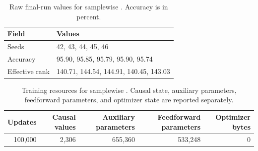 \begin{table}[H]
\centering
\small
\caption{Raw final-run values for samplewise \TeReL{}. Accuracy is in percent.}
\label{tab:residual-state-raw}
\begin{tabular}{ll}
\toprule
Field & Values \\
\midrule
Seeds & 42, 43, 44, 45, 46 \\
Accuracy & 95.90, 95.85, 95.79, 95.90, 95.74 \\
Effective rank & 140.71, 144.54, 144.91, 140.45, 143.03 \\
\bottomrule
\end{tabular}
\end{table}

\begin{table}[H]
\centering
\small
\caption{Training resources for samplewise \TeReL{}. Causal state, auxiliary parameters, feedforward parameters, and optimizer state are reported separately.}
\label{tab:residual-state-resources}
\begin{tabular}{rrrrr}
\toprule
Updates & Causal values & Auxiliary parameters & Feedforward parameters & Optimizer bytes \\
\midrule
100,000 & 2,306 & 655,360 & 533,248 & 0 \\
\bottomrule
\end{tabular}
\end{table}
